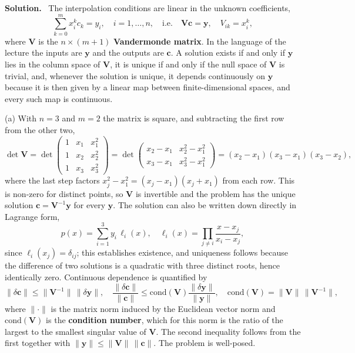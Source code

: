 \documentclass[a4paper,12pt]{paper}
\newenvironment{solution}{\par\noindent\textbf{Solution.}\ }{\par\medskip}
\begin{document}
\begin{solution}
The interpolation conditions are linear in the unknown coefficients,
\begin{equation}
\sum_{k=0}^{m}x_{i}^{k}c_{k}=y_{i},\quad i=1,\dots,n,
\quad\text{i.e.}\quad
\mathbf{V}\mathbf{c}=\mathbf{y},\quad V_{ik}=x_{i}^{k},
\label{eq:34}
\end{equation}
where $\mathbf{V}$ is the $n\times(m+1)$ \textbf{Vandermonde matrix}. In the language of
the lecture the inputs are $\mathbf{y}$ and the outputs are $\mathbf{c}$. A solution exists
if and only if $\mathbf{y}$ lies in the column space of $\mathbf{V}$, it is unique if and
only if the null space of $\mathbf{V}$ is trivial, and, whenever the solution is unique,
it depends continuously on $\mathbf{y}$ because it is then given by a linear map between
finite-dimensional spaces, and every such map is continuous.

(a) With $n=3$ and $m=2$ the matrix is square, and subtracting the first row from the
other two,
\begin{equation}
\det\mathbf{V}=\det\begin{pmatrix}1&x_{1}&x_{1}^{2}\\1&x_{2}&x_{2}^{2}\\1&x_{3}&x_{3}^{2}\end{pmatrix}
=\det\begin{pmatrix}x_{2}-x_{1}&x_{2}^{2}-x_{1}^{2}\\x_{3}-x_{1}&x_{3}^{2}-x_{1}^{2}\end{pmatrix}
=(x_{2}-x_{1})(x_{3}-x_{1})(x_{3}-x_{2}),
\label{eq:35}
\end{equation}
where the last step factors $x_{j}^{2}-x_{1}^{2}=(x_{j}-x_{1})(x_{j}+x_{1})$ from each row.
This is non-zero for distinct points, so $\mathbf{V}$ is invertible and the problem has
the unique solution $\mathbf{c}=\mathbf{V}^{-1}\mathbf{y}$ for every $\mathbf{y}$. The
solution can also be written down directly in Lagrange form,
\begin{equation}
p(x)=\sum_{i=1}^{3}y_{i}\,\ell_{i}(x),\quad
\ell_{i}(x)=\prod_{j\neq i}\frac{x-x_{j}}{x_{i}-x_{j}},
\label{eq:36}
\end{equation}
since $\ell_{i}(x_{j})=\delta_{ij}$; this establishes existence, and uniqueness follows
because the difference of two solutions is a quadratic with three distinct roots, hence
identically zero. Continuous dependence is quantified by
\begin{equation}
\|\delta\mathbf{c}\|\le\|\mathbf{V}^{-1}\|\,\|\delta\mathbf{y}\|,
\quad
\frac{\|\delta\mathbf{c}\|}{\|\mathbf{c}\|}\le\mathrm{cond}(\mathbf{V})\frac{\|\delta\mathbf{y}\|}{\|\mathbf{y}\|},
\quad
\mathrm{cond}(\mathbf{V})=\|\mathbf{V}\|\,\|\mathbf{V}^{-1}\|,
\label{eq:37}
\end{equation}
where $\|\cdot\|$ is the matrix norm induced by the Euclidean vector norm and
$\mathrm{cond}(\mathbf{V})$ is the \textbf{condition number}, which for this norm is the
ratio of the largest to the smallest singular value of $\mathbf{V}$. The second inequality
follows from the first together with $\|\mathbf{y}\|\le\|\mathbf{V}\|\,\|\mathbf{c}\|$.
The problem is well-posed.


\end{solution}
\end{document}
